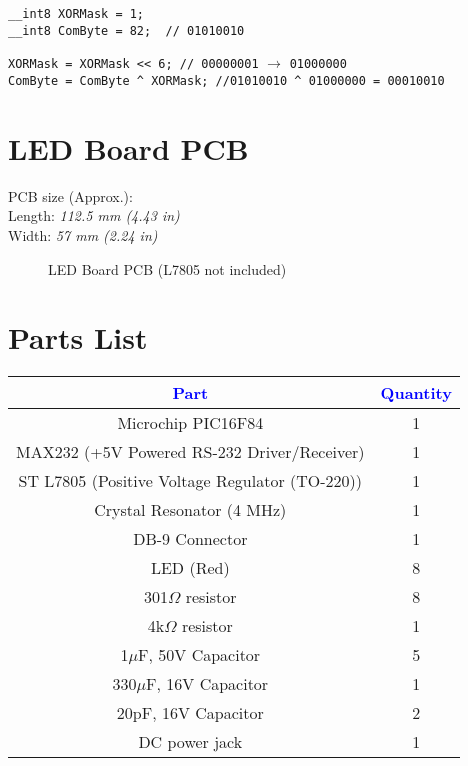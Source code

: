 \documentclass{article}
\begin{document}
\begin{verbatim}
__int8 XORMask = 1;
__int8 ComByte = 82;  // 01010010
\end{verbatim}
\verb"XORMask = XORMask << 6; // 00000001" $\longrightarrow$
\verb"01000000"\\
\verb"ComByte = ComByte ^ XORMask; //01010010 ^ 01000000 = 00010010"

\section{LED Board PCB}
PCB size (Approx.):\\
Length: \emph{112.5 mm (4.43 in)}\\
Width: \emph{57 mm (2.24 in)}\\

\begin{figure}

\hspace{1in}
\caption{LED Board PCB (L7805 not included)}
\label{fig:subfig} \end{figure}

\section{Parts List}
\begin{flushleft}
\begin{tabular}{|c|c|}
\hline
\textcolor{blue}{\textbf{Part}} & \textcolor{blue}{\textbf{Quantity}}\\
\hline
Microchip PIC16F84 & 1 \\
\hline
MAX232 (+5V Powered RS-232 Driver/Receiver) & 1\\
\hline
ST L7805 (Positive Voltage Regulator (TO-220)) & 1 \\
\hline
Crystal Resonator (4 MHz) & 1 \\
\hline
DB-9 Connector & 1 \\
\hline
LED (Red) & 8 \\
\hline
301$\Omega$ resistor & 8 \\
\hline
4k$\Omega$ resistor & 1 \\
\hline
1$\mu$F, 50V Capacitor & 5 \\
\hline
330$\mu$F, 16V Capacitor & 1 \\
\hline
20pF, 16V Capacitor & 2 \\
\hline
DC power jack & 1 \\
\hline
\end{tabular}
\end{flushleft}
\end{document}
